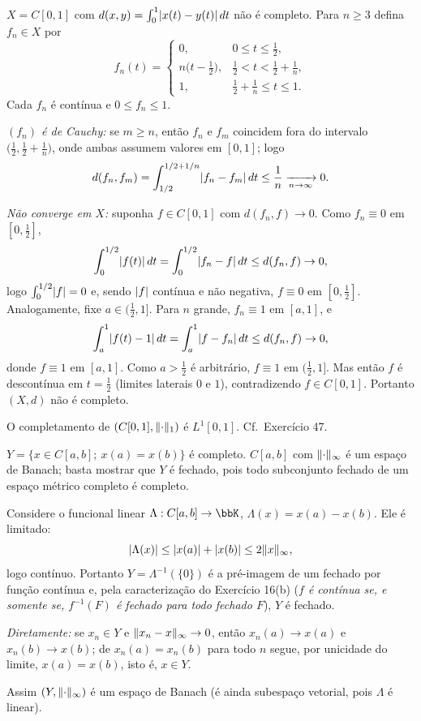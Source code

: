 \begin{exercicio}{$X=C[0,1]$ com $d(x,y)=\int_0^1\lvert x(t)-y(t)\rvert\,dt$ não é completo.}
\sol
Para $n\ge3$ defina $f_n\in X$ por
\[ f_n(t)=\begin{cases} 0, & 0\le t\le \tfrac12,\\[2pt] n\bigl(t-\tfrac12\bigr), & \tfrac12<t<\tfrac12+\tfrac1n,\\[2pt] 1, & \tfrac12+\tfrac1n\le t\le1.\end{cases} \]
Cada $f_n$ é contínua e $0\le f_n\le1$.

\emph{$(f_n)$ é de Cauchy:} se $m\ge n$, então $f_n$ e $f_m$ coincidem fora do intervalo $\bigl(\frac12,\frac12+\frac1n\bigr)$, onde ambas assumem valores em $[0,1]$; logo
\[ d(f_n,f_m)=\int_{1/2}^{1/2+1/n}\lvert f_n-f_m\rvert\,dt\le\frac1n\xrightarrow[n\to\infty]{}0. \]

\emph{Não converge em $X$:} suponha $f\in C[0,1]$ com $d(f_n,f)\to0$. Como $f_n\equiv0$ em $[0,\frac12]$,
\[ \int_0^{1/2}\lvert f(t)\rvert\,dt=\int_0^{1/2}\lvert f_n-f\rvert\,dt\le d(f_n,f)\to0, \]
logo $\int_0^{1/2}\lvert f\rvert=0$ e, sendo $\lvert f\rvert$ contínua e não negativa, $f\equiv0$ em $[0,\frac12]$. Analogamente, fixe $a\in(\frac12,1]$. Para $n$ grande, $f_n\equiv1$ em $[a,1]$, e
\[ \int_a^1\lvert f(t)-1\rvert\,dt=\int_a^1\lvert f-f_n\rvert\,dt\le d(f_n,f)\to0, \]
donde $f\equiv1$ em $[a,1]$. Como $a>\frac12$ é arbitrário, $f\equiv1$ em $(\frac12,1]$. Mas então $f$ é descontínua em $t=\frac12$ (limites laterais $0$ e $1$), contradizendo $f\in C[0,1]$. Portanto $(X,d)$ não é completo.

\begin{obs}
O completamento de $(C[0,1],\lVert\cdot\rVert_1)$ é $L^1[0,1]$. Cf.\ Exercício 47.
\end{obs}
\end{exercicio}

\begin{exercicio}{$Y=\{x\in C[a,b];\ x(a)=x(b)\}$ é completo.}
\sol
$C[a,b]$ com $\lVert\cdot\rVert_\infty$ é um espaço de Banach; basta mostrar que $Y$ é fechado, pois todo subconjunto fechado de um espaço métrico completo é completo.

Considere o funcional linear $\Lambda:C[a,b]\to\bbK$, $\Lambda(x)=x(a)-x(b)$. Ele é limitado:
\[ \lvert\Lambda(x)\rvert\le\lvert x(a)\rvert+\lvert x(b)\rvert\le2\lVert x\rVert_\infty, \]
logo contínuo. Portanto $Y=\Lambda^{-1}(\{0\})$ é a pré-imagem de um fechado por função contínua e, pela caracterização do Exercício 16(b) (\emph{$f$ é contínua se, e somente se, $f^{-1}(F)$ é fechado para todo fechado $F$}), $Y$ é fechado.

\emph{Diretamente:} se $x_n\in Y$ e $\lVert x_n-x\rVert_\infty\to0$, então $x_n(a)\to x(a)$ e $x_n(b)\to x(b)$; de $x_n(a)=x_n(b)$ para todo $n$ segue, por unicidade do limite, $x(a)=x(b)$, isto é, $x\in Y$.

Assim $(Y,\lVert\cdot\rVert_\infty)$ é um espaço de Banach (é ainda subespaço vetorial, pois $\Lambda$ é linear).
\end{exercicio}

